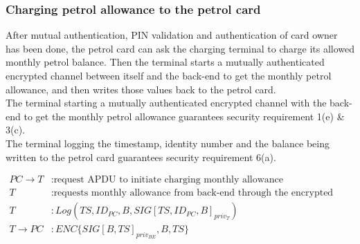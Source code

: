 \subsubsection{Charging petrol allowance to the petrol card}
After mutual authentication, PIN validation and authentication of card owner
has been done, the petrol card can ask the charging terminal to charge its
allowed monthly petrol balance. Then the terminal starts a mutually
authenticated encrypted channel between itself and the back-end to get the monthly petrol allowance, and then
writes those values back to the petrol card.\\

The terminal starting a mutually authenticated encrypted channel with the back-end to get the monthly petrol allowance guarantees security requirement 1(e) \& 3(c).\\

The terminal logging the timestamp, identity number and the balance being written to the petrol card guarantees security requirement 6(a).

\begin{equation}\nonumber
\begin{split}
PC \to T&: \text{request APDU to initiate charging monthly allowance} \\
T&: \text{requests monthly allowance from back-end through the encrypted channel} \\
T&: Log(TS, ID_{PC}, B, SIG[TS, ID_{PC}, B]_{priv_T}) \\
T \to PC&: ENC\{SIG[B,TS]_{priv_{BE}}, B, TS\}
\end{split} 
\end{equation}
